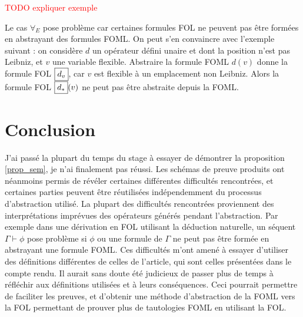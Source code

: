 \documentclass[12pt]{article}
\newcommand{\FOL}{\ensuremath{\textup{\tiny{}FOL}}}
\newcommand{\raph}[1]{\textcolor{red}{#1}}
\begin{document}
\bigskip \bigskip

\raph{TODO expliquer exemple}
  
Le cas $\forall_E$ pose problème car certaines formules FOL ne peuvent pas être formées en abstrayant des formules FOML.
On peut s'en convaincre avec l'exemple suivant : on considère $d$ un opérateur défini unaire et dont la position n'est pas Leibniz, et $v$ une variable flexible.
Abstraire la formule FOML $d(v)$ donne la formule FOL \( \fbox{$d_v$} \), car $v$ est flexible à un emplacement non Leibniz.
Alors la formule FOL \( \fbox{$d_*$}(v) \) ne peut pas être abstraite depuis la FOML.

\section{Conclusion}

J'ai passé la plupart du temps du stage à essayer de démontrer la proposition \ref{prop_sem}, je n'ai finalement pas réussi.
Les schémas de preuve produits ont néanmoins permis de révéler certaines différentes difficultés rencontrées, et certaines parties peuvent être réutilisées indépendemment du processus d'abstraction utilisé.
La plupart des difficultés rencontrées proviennent des interprétations \og{}imprévues\fg{} des opérateurs générés pendant l'abstraction.
Par exemple dans une dérivation en FOL utilisant la déduction naturelle, un séquent $\Gamma \vdash \phi$ pose problème si $\phi$ ou une formule de $\Gamma$ ne peut pas être formée en abstrayant une formule FOML.
Ces difficultés m'ont amené à essayer d'utiliser des définitions différentes de celles de l'article, qui sont celles présentées dans le compte rendu.
Il aurait sans doute été judicieux de passer plus de temps à réfléchir aux définitions utilisées et à leurs conséquences.
Ceci pourrait permettre de faciliter les preuves, et d'obtenir une méthode d'abstraction de la FOML vers la FOL permettant de prouver plus de tautologies FOML en utilisant la FOL.
\end{document}

